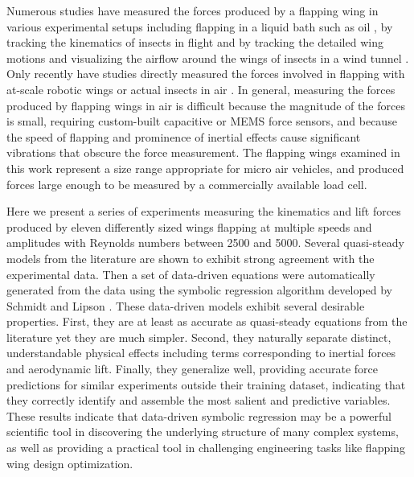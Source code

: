 \documentclass{article}
\begin{document}

Numerous studies have measured the forces produced by a flapping wing in various
experimental setups including flapping in a liquid bath such as oil
\cite{walker2009photogrammetric}, by tracking the kinematics of insects in
flight \cite{fry2003aerodynamics,ristroph2009automated} and by tracking the
detailed wing motions and visualizing the airflow around the wings of insects in
a wind tunnel \cite{young2009details}.  Only recently have studies directly
measured the forces involved in flapping with at-scale robotic wings or actual
insects in air \cite{whitney2010aeromechanics,graetzel2008real}.  In general,
measuring the forces produced by flapping wings in air is difficult because the
magnitude of the forces is small, requiring custom-built capacitive or MEMS
force sensors, and because the speed of flapping and prominence of inertial
effects cause significant vibrations that obscure the force measurement.  The
flapping wings examined in this work represent a size range appropriate for
micro air vehicles, and produced forces large enough to be measured by a
commercially available load cell.

Here we present a series of experiments measuring the kinematics and lift forces
produced by eleven differently sized wings flapping at multiple speeds and
amplitudes with Reynolds numbers between 2500 and 5000. Several quasi-steady
models from the literature are shown to exhibit strong agreement with the
experimental data. Then a set of data-driven equations were automatically
generated from the data using the symbolic regression algorithm developed by
Schmidt and Lipson \cite{schmidt2009distilling}. These data-driven models
exhibit several desirable properties. First, they are at least as accurate as
quasi-steady equations from the literature yet they are much simpler.  Second,
they naturally separate distinct, understandable physical effects including
terms corresponding to inertial forces and aerodynamic lift. Finally, they
generalize well, providing accurate force predictions for similar experiments
outside their training dataset, indicating that they correctly identify and
assemble the most salient and predictive variables. These results indicate that
data-driven symbolic regression may be a powerful scientific tool in discovering
the underlying structure of many complex systems, as well as providing a
practical tool in challenging engineering tasks like flapping wing design
optimization.
\end{document}
